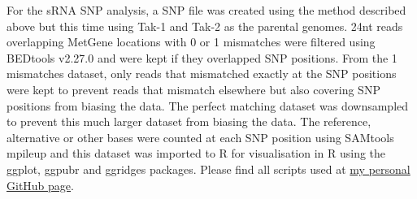 For the sRNA SNP analysis, a SNP file was created using the method described above but this time using Tak-1 and Tak-2 as the parental genomes. 24nt reads overlapping MetGene locations with 0 or 1 mismatches were filtered using BEDtools v2.27.0 and were kept if they overlapped SNP positions. From the 1 mismatches dataset, only reads that mismatched exactly at the SNP positions were kept to prevent reads that mismatch elsewhere but also covering SNP positions from biasing the data. The perfect matching dataset was downsampled to prevent this much larger dataset from biasing the data. The reference, alternative or other bases were counted at each SNP position using SAMtools mpileup and this dataset was imported to R for visualisation in R using the ggplot, ggpubr and ggridges packages. Please find all scripts used at \href{https://github.com/talasjudit}{my personal GitHub page}.


